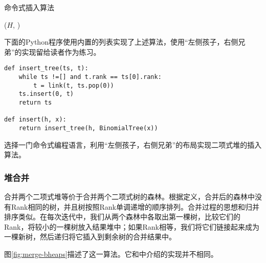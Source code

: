 \documentclass{ctexart}
\begin{document}
\begin{algorithm}
\caption{命令式插入算法}
\label{alg:bheap-insert}
\begin{algorithmic}[1]
  \State \Return {}($H$, )
\EndFunction
\end{algorithmic}
\end{algorithm}

下面的Python程序使用内置的列表实现了上述算法，使用“左侧孩子，右侧兄弟”的实现留给读者作为练习。

\lstset{language=Python}
\begin{lstlisting}
def insert_tree(ts, t):
    while ts !=[] and t.rank == ts[0].rank:
        t = link(t, ts.pop(0))
    ts.insert(0, t)
    return ts

def insert(h, x):
    return insert_tree(h, BinomialTree(x))
\end{lstlisting}

\begin{Exercise}
选择一门命令式编程语言，利用“左侧孩子，右侧兄弟”的布局实现二项式堆的插入算法。
\end{Exercise}


\subsubsection{堆合并}

合并两个二项式堆等价于合并两个二项式树的森林。根据定义，合并后的森林中没有Rank相同的树，并且树按照Rank单调递增的顺序排列。合并过程的思想和归并排序类似。在每次迭代中，我们从两个森林中各取出第一棵树，比较它们的Rank，将较小的一棵树放入结果堆中；如果Rank相等，我们将它们链接起来成为一棵新树，然后递归将它插入到剩余树的合并结果中。

图\ref{fig:merge-bheaps}描述了这一算法。它和\cite{CLRS}中介绍的实现并不相同。
\end{document}

